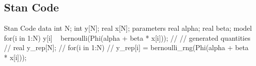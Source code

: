 \documentclass{article}
\begin{document}
\subsection{Stan Code}
\begin{sexylisting}{Stan Code}
data{
int N;  
int y[N];
real x[N];
}
parameters{
  real alpha;
  real beta;
}
model{
  for(i in 1:N)
  y[i] ~ bernoulli(Phi(alpha + beta * x[i]));
// }
// generated quantities{
//   real y_rep[N];
//   for(i in 1:N)
//   y_rep[i] = bernoulli_rng(Phi(alpha + beta * x[i]));
}
\end{sexylisting}
  
  
\end{document}
